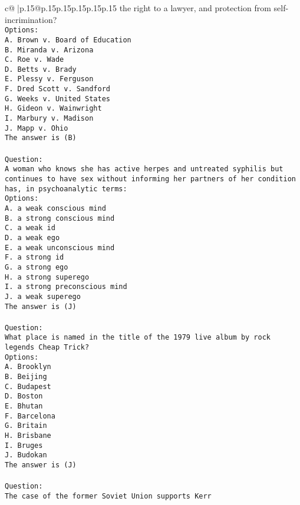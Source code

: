 \documentclass{article}
\begin{document}
{\begin{supertabular}{c@{$\;$}|p{.15\linewidth}@{}p{.15\linewidth}p{.15\linewidth}p{.15\linewidth}p{.15\linewidth}p{.15\linewidth}}
{{{the right to a lawyer, and protection from self-incrimination?\\ \tt Options:\\ \tt A. Brown v. Board of Education\\ \tt B. Miranda v. Arizona\\ \tt C. Roe v. Wade\\ \tt D. Betts v. Brady\\ \tt E. Plessy v. Ferguson\\ \tt F. Dred Scott v. Sandford\\ \tt G. Weeks v. United States\\ \tt H. Gideon v. Wainwright\\ \tt I. Marbury v. Madison\\ \tt J. Mapp v. Ohio\\ \tt The answer is (B)\\ \tt \\ \tt Question:\\ \tt A woman who knows she has active herpes and untreated syphilis but continues to have sex without informing her partners of her condition has, in psychoanalytic terms:\\ \tt Options:\\ \tt A. a weak conscious mind\\ \tt B. a strong conscious mind\\ \tt C. a weak id\\ \tt D. a weak ego\\ \tt E. a weak unconscious mind\\ \tt F. a strong id\\ \tt G. a strong ego\\ \tt H. a strong superego\\ \tt I. a strong preconscious mind\\ \tt J. a weak superego\\ \tt The answer is (J)\\ \tt \\ \tt Question:\\ \tt What place is named in the title of the 1979 live album by rock legends Cheap Trick?\\ \tt Options:\\ \tt A. Brooklyn\\ \tt B. Beijing\\ \tt C. Budapest\\ \tt D. Boston\\ \tt E. Bhutan\\ \tt F. Barcelona\\ \tt G. Britain\\ \tt H. Brisbane\\ \tt I. Bruges\\ \tt J. Budokan\\ \tt The answer is (J)\\ \tt \\ \tt Question:\\ \tt The case of the former Soviet Union supports Kerr }}}
\end{supertabular}}
\end{document}
